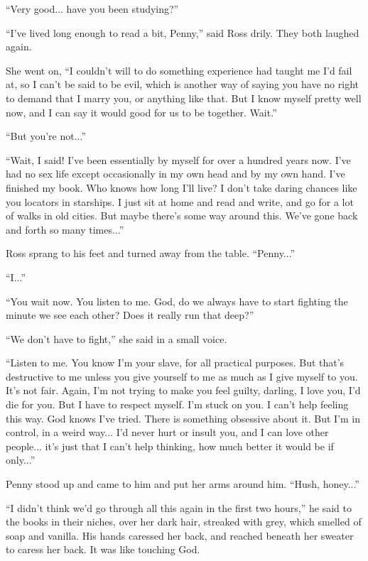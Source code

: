 \documentclass[english,11pt,letterpaper,onecolumn]{scrbook}
\begin{document}
	``Very good... have you been studying?''

	``I've lived long enough to read a bit, Penny,'' said Ross drily.  They both laughed again.  

	She went on, ``I couldn't will to do something experience had taught me I'd fail at, so I can't be said to be evil, which is another way of saying you have no right to demand that I marry you, or anything like that.  But I know myself pretty well now, and I can say it would good for us to be together.  Wait.''

	``But you're not...''

	``Wait, I said!  I've been essentially by myself for over a hundred years now.  I've had no sex life except occasionally in my own head and by my own hand.  I've finished my book.  Who knows how long I'll live?  I don't take daring chances like you locators in starships.  I just sit at home and read and write, and go for a lot of walks in old cities.  But maybe there's some way around this.  We've gone back and forth so many times...''

	Ross sprang to his feet and turned away from the table.  ``Penny...''

	``I...''

	``You wait now.  You listen to me.  God, do we always have to start fighting the minute we see each other?  Does it really run that deep?''

	``We don't have to fight,'' she said in a small voice.

	``Listen to me.  You know I'm your slave, for all practical purposes.  But that's destructive to me unless you give yourself to me as much as I give myself to you.  It's not fair.  Again, I'm not trying to make you feel guilty, darling, I love you, I'd die for you.  But I have to respect myself.  I'm stuck on you.  I can't help feeling this way.  God knows I've tried.  There is something obsessive about it.  But I'm in control, in a weird way... I'd never hurt or insult you, and I can love other people... it's just that I can't help thinking, how much better it would be if only...''

	Penny stood up and came to him and put her arms around him.  ``Hush, honey...''

	``I didn't think we'd go through all this again in the first two hours,'' he said to the books in their niches, over her dark hair, streaked with grey, which smelled of soap and vanilla.  His hands caressed her back, and reached beneath her sweater to caress her back.  It was like touching God.
\end{document}
